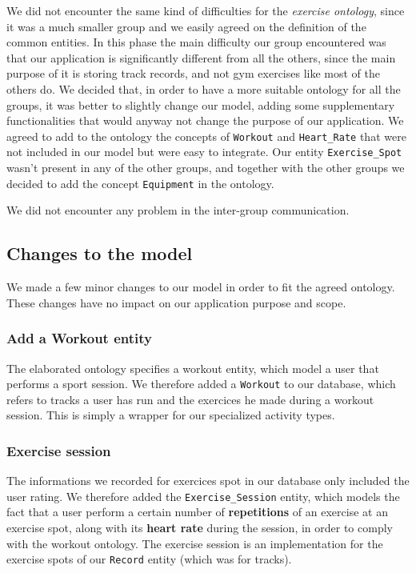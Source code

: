 \documentclass[a4paper]{article}
\begin{document}
We did not encounter the same kind of difficulties for the \textit{exercise ontology}, since it was a much smaller group and we easily agreed on the definition of the common entities.
In this phase the main difficulty our group encountered was that our application is significantly different from all the others, since the main purpose of it is storing track records, and not gym exercises like most of the others do.
We decided that, in order to have a more suitable ontology for all the groups, it was better to slightly change our model, adding some supplementary functionalities that would anyway not change the purpose of our application. 
We agreed to add to the ontology the concepts of \texttt{Workout} and \texttt{Heart\_Rate} that were not included in our model but were easy to integrate. 
Our entity \texttt{Exercise\_Spot} wasn't present in any of the other groups, and together with the other groups we decided to add the concept \texttt{Equipment} in the ontology.

We did not encounter any problem in the inter-group communication. 

\subsection{Changes to the model}
We made a few minor changes to our model in order to fit the agreed ontology. These changes have no impact on our application purpose and scope.

\subsubsection{Add a Workout entity}
The elaborated ontology specifies a workout entity, which model a user that performs a sport session. We therefore added a \texttt{Workout} to our database, which refers to tracks a user has run and the exercices he made during a workout session. This is simply a wrapper for our specialized activity types.

\subsubsection{Exercise session}
The informations we recorded for exercices spot in our database only included the user rating. We therefore added the \texttt{Exercise\_Session} entity, which models the fact that a user perform a certain number of \textbf{repetitions} of an exercise at an exercise spot, along with its \textbf{heart rate} during the session, in order to comply with the workout ontology. The exercise session is an implementation for the exercise spots of our \texttt{Record} entity (which was for tracks).
\end{document}
